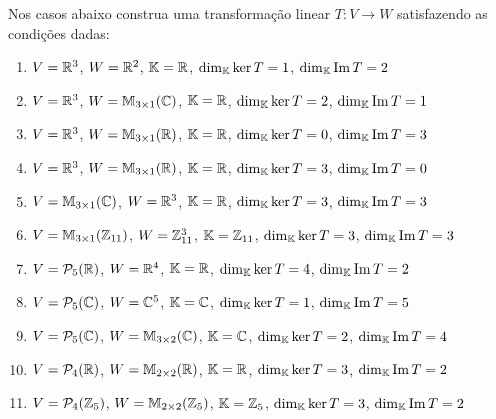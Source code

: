 \documentclass[12pt]{exam}
\begin{document}
\begin{exercicio}
  Nos casos abaixo construa uma transforma\c{c}\~ao linear $T : V \to W$ satisfazendo as condi\c{c}\~oes dadas:
  \begin{enumerate}[label=({\alph*})]
    \item $V = \mathbb{R}^3$, $W = \mathbb{R}^2$, $\mathbb{K} = \mathbb{R}$, $\dim_{\mathbb{K}} \ker T = 1$, $\dim_{\mathbb{K}} {\rm Im\,} T = 2$
    \item $V = \mathbb{R}^3$, $W = \mathbb{M}_{3\times 1}(\mathbb{C})$, $\mathbb{K} = \mathbb{R}$, $\dim_{\mathbb{K}} \ker T = 2$, $\dim_{\mathbb{K}} {\rm Im\,} T = 1$
    \item $V = \mathbb{R}^3$, $W = \mathbb{M}_{3\times 1}(\mathbb{R})$, $\mathbb{K} = \mathbb{R}$, $\dim_{\mathbb{K}} \ker T = 0$, $\dim_{\mathbb{K}} {\rm Im\,} T = 3$
    \item $V = \mathbb{R}^3$, $W = \mathbb{M}_{3\times 1}(\mathbb{R})$, $\mathbb{K} = \mathbb{R}$, $\dim_{\mathbb{K}} \ker T = 3$, $\dim_{\mathbb{K}} {\rm Im\,} T = 0$
    \item $V = \mathbb{M}_{3\times 1}(\mathbb{C})$, $W = \mathbb{R}^3$, $\mathbb{K} = \mathbb{R}$, $\dim_{\mathbb{K}} \ker T = 3$, $\dim_{\mathbb{K}} {\rm Im\,} T = 3$
    \item $V = \mathbb{M}_{3\times 1}(\mathbb{Z}_{11})$, $W = \mathbb{Z}_{11}^3$, $\mathbb{K} = \mathbb{Z}_{11}$, $\dim_{\mathbb{K}} \ker T = 3$, $\dim_{\mathbb{K}} {\rm Im\,} T = 3$
    \item $V = \mathcal{P}_5(\mathbb{R})$, $W = \mathbb{R}^4$, $\mathbb{K} = \mathbb{R}$, $\dim_{\mathbb{K}} \ker T = 4$, $\dim_{\mathbb{K}} {\rm Im\,} T = 2$
    \item $V = \mathcal{P}_5(\mathbb{C})$, $W = \mathbb{C}^5$, $\mathbb{K} = \mathbb{C}$, $\dim_{\mathbb{K}} \ker T = 1$, $\dim_{\mathbb{K}} {\rm Im\,} T = 5$
    \item $V = \mathcal{P}_5(\mathbb{C})$, $W = \mathbb{M}_{3\times 2}(\mathbb{C})$, $\mathbb{K} = \mathbb{C}$, $\dim_{\mathbb{K}} \ker T = 2$, $\dim_{\mathbb{K}} {\rm Im\,} T = 4$
    \item $V = \mathcal{P}_4(\mathbb{R})$, $W = \mathbb{M}_{2\times 2}(\mathbb{R})$, $\mathbb{K} = \mathbb{R}$, $\dim_{\mathbb{K}} \ker T = 3$, $\dim_{\mathbb{K}} {\rm Im\,} T = 2$
    \item $V = \mathcal{P}_4(\mathbb{Z}_5)$, $W = \mathbb{M}_{2\times 2}(\mathbb{Z}_5)$, $\mathbb{K} = \mathbb{Z}_5$, $\dim_{\mathbb{K}} \ker T = 3$, $\dim_{\mathbb{K}} {\rm Im\,} T = 2$
  \end{enumerate}
\end{exercicio}
\end{document}
